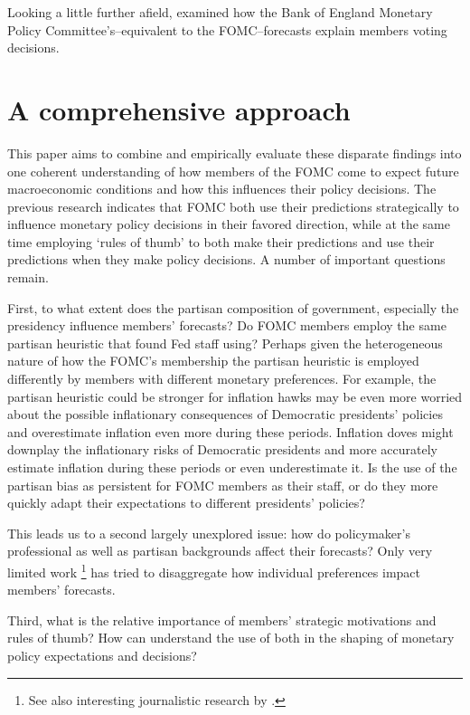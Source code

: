 \documentclass[a4paper]{article}\usepackage[]{graphicx}\usepackage[]{color}
\begin{document}
Looking a little further afield, \cite{Besley2008} examined how the Bank of England Monetary Policy Committee's--equivalent to the FOMC--forecasts explain members voting decisions. 

\section{A comprehensive approach} 

This paper aims to combine and empirically evaluate these disparate findings into one coherent understanding of how members of the FOMC come to expect future macroeconomic conditions and how this influences their policy decisions. The previous research indicates that FOMC both use their predictions strategically to influence monetary policy decisions in their favored direction, while at the same time employing `rules of thumb' to both make their predictions and use their predictions when they make policy decisions. A number of important questions remain. 

First, to what extent does the partisan composition of government, especially the presidency influence members' forecasts? Do FOMC members employ the same partisan heuristic that \cite{gandrud2013does} found Fed staff using? Perhaps given the heterogeneous nature of how the FOMC's membership the partisan heuristic is employed differently by members with different monetary preferences. For example, the partisan heuristic could be stronger for inflation hawks may be even more worried about the possible inflationary consequences of Democratic presidents' policies and overestimate inflation even more during these periods. Inflation doves might downplay the inflationary risks of Democratic presidents and more accurately estimate inflation during these periods or even underestimate it. Is the use of the partisan bias as persistent for FOMC members as their staff, or do they more quickly adapt their expectations to different presidents' policies?

This leads us to a second largely unexplored issue: how do policymaker's professional as well as partisan backgrounds affect their forecasts? Only very limited work \citep[see][]{Tillmann2011}\footnote{See also interesting journalistic research by \cite{Hilsenrath2013}.} has tried to disaggregate how individual preferences impact members' forecasts.

Third, what is the relative importance of members' strategic motivations and rules of thumb? How can understand the use of both in the shaping of monetary policy expectations and decisions?  
\end{document}
